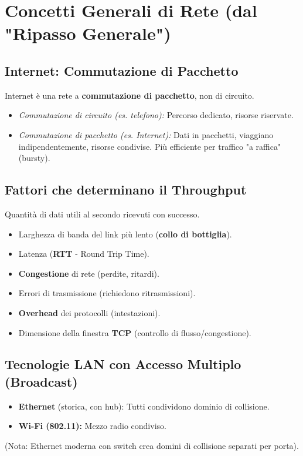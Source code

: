 \documentclass{article}
\begin{document}
\section{Concetti Generali di Rete (dal "Ripasso Generale")}

\subsection{Internet: Commutazione di Pacchetto}
Internet è una rete a \textbf{commutazione di pacchetto}, non di circuito.
\begin{itemize}
    \item \textit{Commutazione di circuito (es. telefono):} Percorso dedicato, risorse riservate.
    \item \textit{Commutazione di pacchetto (es. Internet):} Dati in pacchetti, viaggiano indipendentemente, risorse condivise. Più efficiente per traffico "a raffica" (bursty).
\end{itemize}

\subsection{Fattori che determinano il Throughput}
Quantità di dati utili al secondo ricevuti con successo.
\begin{itemize}
    \item Larghezza di banda del link più lento (\textbf{collo di bottiglia}).
    \item Latenza (\textbf{RTT} - Round Trip Time).
    \item \textbf{Congestione} di rete (perdite, ritardi).
    \item Errori di trasmissione (richiedono ritrasmissioni).
    \item \textbf{Overhead} dei protocolli (intestazioni).
    \item Dimensione della finestra \textbf{TCP} (controllo di flusso/congestione).
\end{itemize}

\subsection{Tecnologie LAN con Accesso Multiplo (Broadcast)}
\begin{itemize}
    \item \textbf{Ethernet} (storica, con hub): Tutti condividono dominio di collisione.
    \item \textbf{Wi-Fi (802.11):} Mezzo radio condiviso.
\end{itemize}
(Nota: Ethernet moderna con switch crea domini di collisione separati per porta).
\end{document}

